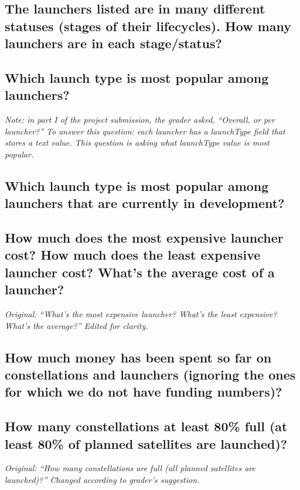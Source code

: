 \documentclass{article}
\begin{document}
    \subsection{The launchers listed are in many different statuses (stages of their lifecycles). How many launchers are in each stage/status?}
    
    \subsection{Which launch type is most popular among launchers?}
    \textit{Note: in part I of the project submission, the grader asked, ``Overall, or per launcher?'' To answer this question: each launcher has a launchType field that stores a text value. This question is asking what launchType value is most popular.}
    
    \subsection{Which launch type is most popular among launchers that are currently in development?}
    
    \subsection{How much does the most expensive launcher cost? How much does the least expensive launcher cost? What's the average cost of a launcher?}
    \textit{Original: ``What's the most expensive launcher? What's the least expensive? What's the average?'' Edited for clarity.}
    
    \subsection{How much money has been spent so far on constellations and launchers (ignoring the ones for which we do not have funding numbers)?}
    
    \subsection{How many constellations at least 80\% full (at least 80\% of planned satellites are launched)?}
    \textit{Original: ``How many constellations are full (all planned satellites are launched)?'' Changed according to grader's suggestion.}
    
\end{document}

